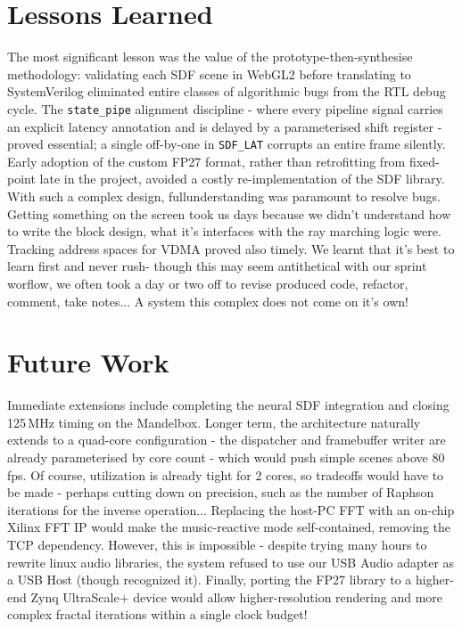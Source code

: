\section{Lessons Learned}

The most significant lesson was the value of the prototype-then-synthesise
methodology: validating each SDF scene in WebGL2 before translating to
SystemVerilog eliminated entire classes of algorithmic bugs from the RTL debug
cycle. The \texttt{state\_pipe} alignment discipline - where every pipeline
signal carries an explicit latency annotation and is delayed by a parameterised
shift register - proved essential; a single off-by-one in \texttt{SDF\_LAT}
corrupts an entire frame silently. Early adoption of the custom FP27 format,
rather than retrofitting from fixed-point late in the project, avoided a
costly re-implementation of the SDF library.
With such a complex design, fullunderstanding was paramount to resolve bugs. Getting something on the screen took us days because we didn't understand how to write the block design, what it's interfaces with the ray marching logic were. Tracking address spaces for VDMA proved also timely. We learnt that it's best to learn first and never rush- though this may seem antithetical with our sprint worflow, we often took a day or two off to revise produced code, refactor, comment, take notes... A system this complex does not come on it's own!

\section{Future Work}

Immediate extensions include completing the neural SDF integration and
closing 125\,MHz timing on the Mandelbox. Longer term, the architecture
naturally extends to a quad-core configuration - the dispatcher and
framebuffer writer are already parameterised by core count - which would
push simple scenes above 80\,fps. Of course, utilization is already tight for 2 cores, so tradeoffs would have to be made - perhaps cutting down on precision, such as the number of Raphson iterations for the inverse operation... Replacing the host-PC FFT with an on-chip
Xilinx FFT IP would make the music-reactive mode self-contained, removing the
TCP dependency. However, this is impossible - despite trying many hours to rewrite linux audio libraries, the system refused to use our USB Audio adapter as a USB Host (though recognized it). Finally, porting the FP27 library to a higher-end Zynq
UltraScale+ device would allow higher-resolution rendering and more complex
fractal iterations within a single clock budget!
